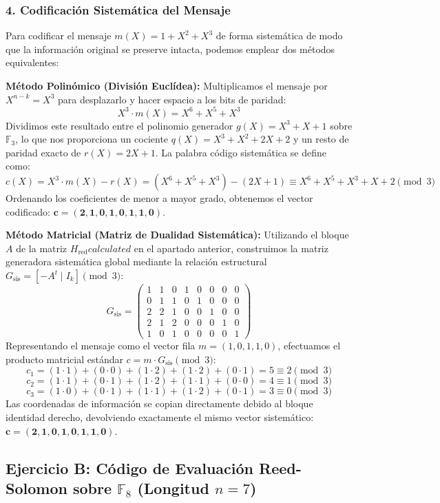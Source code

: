 \documentclass{article}
\begin{document}
\subsubsection{4. Codificación Sistemática del Mensaje}
Para codificar el mensaje $m(X) = 1 + X^2 + X^3$ de forma sistemática de modo que la información original se preserve intacta, podemos emplear dos métodos equivalentes:

\textbf{Método Polinómico (División Euclídea):}
Multiplicamos el mensaje por $X^{n-k} = X^3$ para desplazarlo y hacer espacio a los bits de paridad:
\[
X^3 \cdot m(X) = X^6 + X^5 + X^3
\]
Dividimos este resultado entre el polinomio generador $g(X) = X^3 + X + 1$ sobre $\mathbb{F}_3$, lo que nos proporciona un cociente $q(X) = X^3 + X^2 + 2X + 2$ y un resto de paridad exacto de $r(X) = 2X + 1$. La palabra código sistemática se define como:
\[
c(X) = X^3 \cdot m(X) - r(X) = (X^6 + X^5 + X^3) - (2X + 1) \equiv X^6 + X^5 + X^3 + X + 2 \pmod 3
\]
Ordenando los coeficientes de menor a mayor grado, obtenemos el vector codificado: $\mathbf{c = (2, 1, 0, 1, 0, 1, 1, 0)}$.

\textbf{Método Matricial (Matriz de Dualidad Sistemática):}
Utilizando el bloque $A$ de la matriz $H_{\text{red}} calculated$ en el apartado anterior, construimos la matriz generadora sistemática global mediante la relación estructural $G_{\text{sis}} = [-A^t \mid I_k] \pmod 3$:
\[
G_{\text{sis}} = \begin{pmatrix}
1 & 1 & 0 & 1 & 0 & 0 & 0 & 0 \\
0 & 1 & 1 & 0 & 1 & 0 & 0 & 0 \\
2 & 2 & 1 & 0 & 0 & 1 & 0 & 0 \\
2 & 1 & 2 & 0 & 0 & 0 & 1 & 0 \\
1 & 0 & 1 & 0 & 0 & 0 & 0 & 1
\end{pmatrix}
\]
Representando el mensaje como el vector fila $m = (1, 0, 1, 1, 0)$, efectuamos el producto matricial estándar $c = m \cdot G_{\text{sis}} \pmod 3$:
\[
c_1 = (1\cdot1) + (0\cdot0) + (1\cdot2) + (1\cdot2) + (0\cdot1) = 5 \equiv 2 \pmod 3
\]
\[
c_2 = (1\cdot1) + (0\cdot1) + (1\cdot2) + (1\cdot1) + (0\cdot0) = 4 \equiv 1 \pmod 3
\]
\[
c_3 = (1\cdot0) + (0\cdot1) + (1\cdot1) + (1\cdot2) + (0\cdot1) = 3 \equiv 0 \pmod 3
\]
Las coordenadas de información se copian directamente debido al bloque identidad derecho, devolviendo exactamente el mismo vector sistemático: $\mathbf{c = (2, 1, 0, 1, 0, 1, 1, 0)}$.

\newpage
\subsection{Ejercicio B: Código de Evaluación Reed-Solomon sobre \texorpdfstring{$\mathbb{F}_8$}{F8} (Longitud \texorpdfstring{$n=7$}{n=7})}
\end{document}

